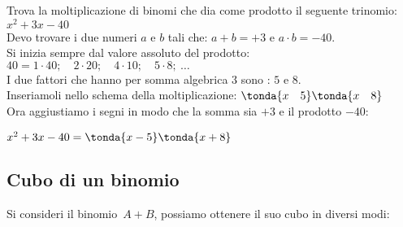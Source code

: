 \begin{esempio}{}{}
Trova la moltiplicazione di binomi che dia come prodotto il seguente 
trinomio: \(x^2+3x-40\)\\
Devo trovare i due numeri \(a\) e \(b\) tali che: 
\(a+b=+3\) e \(a \cdot b=-40\). \\
Si inizia sempre dal valore assoluto del prodotto:\quad
\(40 = 1 \cdot 40; \quad 2 \cdot 20; \quad 4 \cdot 10; 
  \quad 5 \cdot 8;~\dots\)\\
I due fattori che hanno per somma algebrica \(3\) sono : 
\(5\) e \(8\).\\
Inseriamoli nello schema della moltiplicazione: \quad
\(\tonda{x \quad 5} \tonda{x \quad 8}\)\\
Ora aggiustiamo i segni in modo che 
la somma sia \(+3\) e il prodotto \(-40\):\\[-1em]
\begin{center}\(x^2+3x-40 = \tonda{x-5} \tonda{x+8}\)\end{center}
\end{esempio}

\subsection{Cubo di un binomio}
\label{subsec:prodnot_cubo}

Si consideri il binomio~\(A+B\), possiamo ottenere il suo cubo 
in diversi modi:

